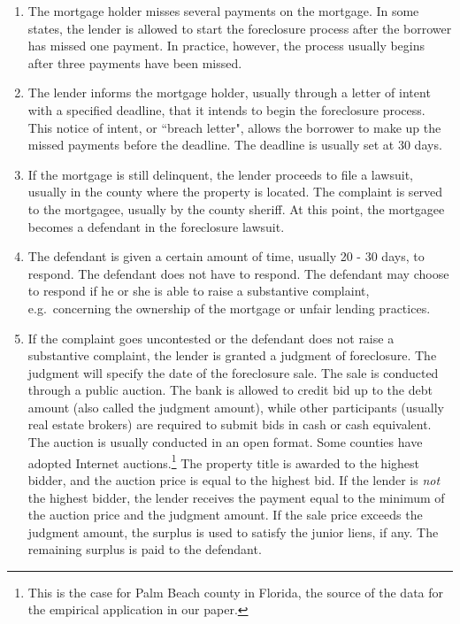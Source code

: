 \documentclass[11pt,twopage]{article}
\begin{document}
\begin{enumerate}
\item The mortgage holder misses several payments on the mortgage. In some states, the lender is allowed to start the foreclosure process after the borrower has missed one payment. In practice, however, the process usually begins after three payments have been missed.
\item The lender informs the mortgage holder, usually through a letter of intent with a specified deadline, that it intends to begin the foreclosure process. This notice of intent, or ``breach letter", allows the borrower to make up the missed payments before the deadline. The deadline is usually set at 30 days.
\item If the mortgage is still delinquent, the lender proceeds to file a lawsuit, usually in the county where the property is located. The complaint is served to the mortgagee, usually by the county sheriff. At this point, the mortgagee becomes a defendant in the foreclosure lawsuit.
\item The defendant is given a certain amount of time, usually 20 - 30 days, to respond. The defendant does not have to  respond. The defendant may choose to respond if he or she is able to raise a substantive complaint, e.g.\ concerning the ownership of the mortgage or unfair lending practices.
\item If the complaint goes uncontested or the defendant does not raise a substantive complaint, the lender is granted a judgment of foreclosure. The judgment will specify the date of the foreclosure sale. The sale is conducted through a public auction. The bank is allowed to credit bid up to the debt amount (also called the judgment amount), while other participants (usually real estate brokers) are required to submit bids in cash or cash equivalent. The auction is usually conducted in an open format. Some counties have adopted Internet auctions.\footnote{This is the case for Palm Beach county in Florida, the source of the data for the empirical application in our paper.} The property title is awarded to the highest bidder, and the auction price is equal to the highest bid. If the lender is \emph{not} the highest bidder, the lender receives the payment equal to the minimum of the auction price and the judgment amount. If the sale price exceeds the judgment amount, the surplus is used to satisfy the junior liens, if any. The remaining surplus is paid to the defendant.\label{enum:auction}
\end{enumerate}
\end{document}
